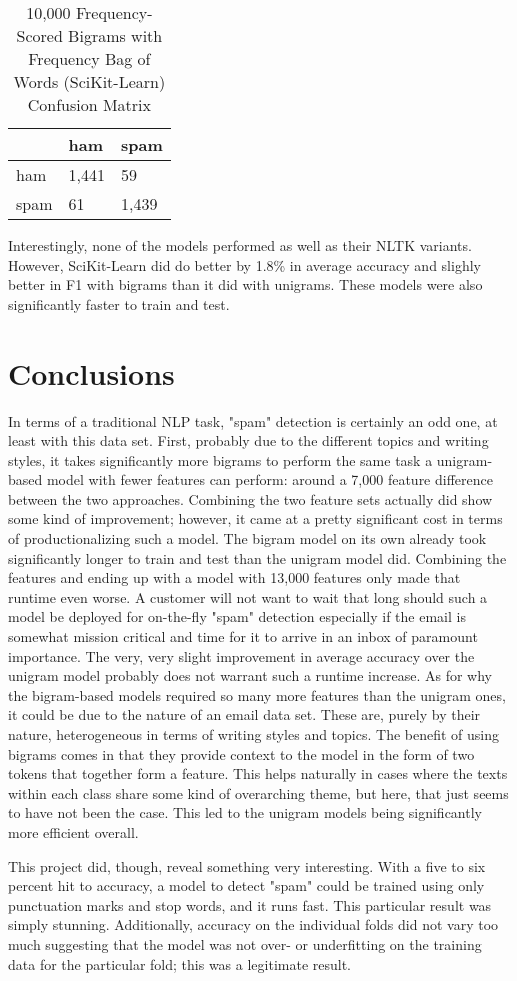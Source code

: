 \documentclass[a4paper]{article}
\begin{document}
	\begin{table}[H]
		\centering
		\caption{10,000 Frequency-Scored Bigrams with Frequency Bag of Words (SciKit-Learn) Confusion Matrix}
		\begin{tabular}{l|ll}
			& ham & spam \\
			\hline
			ham & 1,441 & 59 \\
			spam & 61 & 1,439
		\end{tabular}
	\end{table}

	Interestingly, none of the models performed as well as their NLTK variants. However, SciKit-Learn did do better by 1.8\% in average accuracy and slighly better in F1 with bigrams than it did with unigrams. These models were also significantly faster to train and test.

	\section{Conclusions}
	
	In terms of a traditional NLP task, "spam" detection is certainly an odd one, at least with this data set. First, probably due to the different topics and writing styles, it takes significantly more bigrams to perform the same task a unigram-based model with fewer features can perform: around a 7,000 feature difference between the two approaches. Combining the two feature sets actually did show some kind of improvement; however, it came at a pretty significant cost in terms of productionalizing such a model. The bigram model on its own already took significantly longer to train and test than the unigram model did. Combining the features and ending up with a model with 13,000 features only made that runtime even worse. A customer will not want to wait that long should such a model be deployed for on-the-fly "spam" detection especially if the email is somewhat mission critical and time for it to arrive in an inbox of paramount importance. The very, very slight improvement in average accuracy over the unigram model probably does not warrant such a runtime increase. As for why the bigram-based models required so many more features than the unigram ones, it could be due to the nature of an email data set. These are, purely by their nature, heterogeneous in terms of writing styles and topics. The benefit of using bigrams comes in that they provide context to the model in the form of two tokens that together form a feature. This helps naturally in cases where the texts within each class share some kind of overarching theme, but here, that just seems to have not been the case. This led to the unigram models being significantly more efficient overall.
	
	This project did, though, reveal something very interesting. With a five to six percent hit to accuracy, a model to detect "spam" could be trained using only punctuation marks and stop words, and it runs fast. This particular result was simply stunning. Additionally, accuracy on the individual folds did not vary too much suggesting that the model was not over- or underfitting on the training data for the particular fold; this was a legitimate result.
	
	
\end{document}
